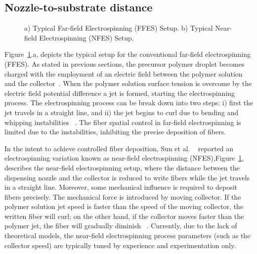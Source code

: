\documentclass[5p,,preprint,12pt,twocolumn]{elsarticle}
\makeatletter
\def\fixFloatSize#1{}%
\makeatother
\begin{document}
\subsection{Nozzle-to-substrate distance}
\bgroup
\fixFloatSize{images/3c63cd76-6542-45b7-aa5a-2f90200fecb4-uffes_vs_nfes.png}
\begin{figure}[!htbp]
\centering \makeatletter{}
\makeatother 
\caption{{a) Typical Far-field Electrospinning (FFES) Setup. b) Typical Near-field Electrospinning (NFES) Setup.}}
\label{f-fbe88d27b932}
\end{figure}
\egroup
Figure~\ref{f-fbe88d27b932}.a, depicts the typical setup for the conventional far-field electrospinning (FFES). As stated in previous sections, the precursor polymer droplet becomes charged with the employment of an electric field between the polymer solution and the collector\unskip~\cite{527120:14135125}. When the polymer solution surface tension is overcome by the electric field potential difference a jet is formed, starting the electrospinning process. The electrospinning process can be break down into two steps: i) first the jet travels in a straight line, and ii) the jet begins to curl due to bending and whipping instabilities \unskip~\cite{527120:13444381,527120:14135543}. The fiber spatial control in far-field electrospinning is limited due to the instabilities, inhibiting the precise deposition of fibers.

In the intent to achieve controlled fiber deposition, Sun et al. \unskip~\cite{527120:11974321} reported an electrospinning variation known as near-field electrospinning (NFES),Figure~\ref{f-fbe88d27b932}, describes the near-field electrospinning setup, where the distance between the dispensing nozzle and the collector is reduced to write fibers while the jet travels in a straight line. Moreover, some mechanical influence is required to deposit fibers precisely. The mechanical force is introduced by moving collector. If the polymer solution jet speed is faster than the speed of the moving collector, the written fiber will curl; on the other hand, if the collector moves faster than the polymer jet, the fiber will gradually diminish \unskip~\cite{527120:11974327,527120:11974326}. Currently, due to the lack of theoretical models, the near-field electrospinning process parameters (such as the collector speed) are typically tuned by experience and experimentation only.
\end{document}
